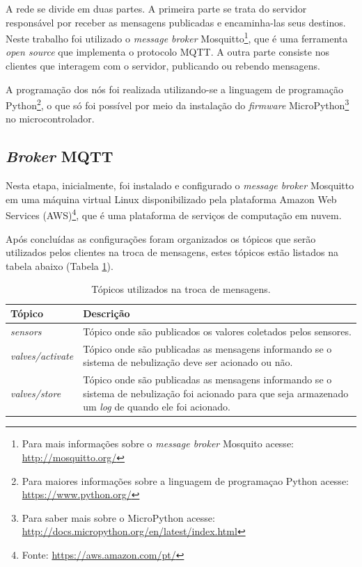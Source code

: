 A rede se divide em duas partes. A primeira parte se trata do servidor responsável por receber as mensagens publicadas e encaminha-las seus destinos. Neste trabalho foi utilizado o \textit{message broker} Mosquitto\footnote[2]{Para mais informações sobre o \textit{message broker} Mosquito acesse: \url{http://mosquitto.org/}}, que é uma ferramenta \textit{open source} que implementa o protocolo MQTT. A outra parte consiste nos clientes que interagem com o servidor, publicando ou rebendo mensagens.

A programação dos nós foi realizada utilizando-se a linguagem de programação Python\footnote[3]{Para maiores informações sobre a linguagem de programaçao Python acesse: \url{https://www.python.org/}}, o que só foi possível por meio da instalação do \textit{firmware} MicroPython\footnote[4]{Para saber mais sobre o MicroPython acesse: \url{http://docs.micropython.org/en/latest/index.html}} no microcontrolador.


\subsection{\textit{Broker} MQTT}
Nesta etapa, inicialmente, foi instalado e configurado o \textit{message broker} Mosquitto em uma máquina virtual Linux disponibilizado pela plataforma Amazon Web Services (AWS)\footnote[5]{Fonte: \url{https://aws.amazon.com/pt/}}, que é uma plataforma de serviços de computação em nuvem.

Após concluídas as configurações foram organizados os tópicos que serão utilizados pelos clientes na troca de mensagens, estes tópicos estão listados na tabela abaixo (Tabela \ref{tab:topicos-mqtt}).

\begin{table}[H]
\centering
\caption{Tópicos utilizados na troca de mensagens.}
\begin{tabular}{p{80pt}|p{300pt}}
\hline
\textbf{Tópico} 			& \textbf{Descrição}\\
\hline
\textit{sensors} 			& Tópico onde são publicados os valores coletados pelos sensores.\\
\hline
\textit{valves/activate}    & Tópico onde são publicadas as mensagens informando se o sistema de nebulização deve ser acionado ou não.\\
\hline
\textit{valves/store}		& Tópico onde são publicadas as mensagens informando se o sistema de nebulização foi acionado para que seja armazenado um \textit{log} de quando ele foi acionado.\\
\hline
\end{tabular}
\label{tab:topicos-mqtt}
\end{table}


